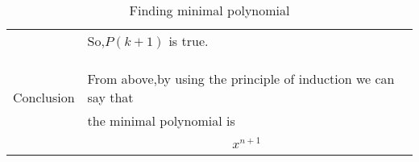 \documentclass[journal,12pt]{IEEEtran}
\begin{document}
\begin{longtable}{|l|l|}
	&So,$P(k+1)$ is true.\\
	&\\
	&\\
    \hline
	\multirow{3}{*}{Conclusion} & \\
	& From above,by using the principle of induction we can say that\\ &the minimal polynomial is\\
	&\parbox{10cm}
	{\begin{align}
	x^{n+1}
	\end{align}}\\
	& \\
	\hline
	\caption{Finding minimal polynomial}
    \label{table:2}
\end{longtable}
\end{document}
